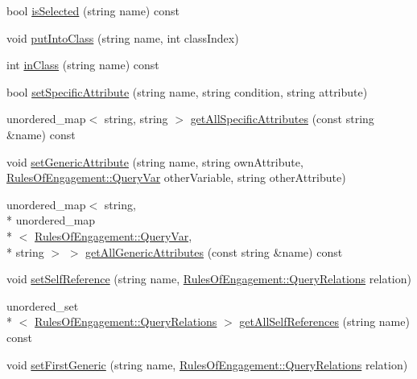 \begin{DoxyCompactItemize}
\item 
bool \hyperlink{class_synonym_table_adeb09b979a0bcd53d00bebf7fd92354f}{is\-Selected} (string name) const 
\item 
void \hyperlink{class_synonym_table_a461d53cb875fda3483d518a0a8a8427a}{put\-Into\-Class} (string name, int class\-Index)
\item 
int \hyperlink{class_synonym_table_a4e52969d9060d59eb5043116a4585557}{in\-Class} (string name) const 
\item 
bool \hyperlink{class_synonym_table_ac0c497004d152f96c11dad973661f0f4}{set\-Specific\-Attribute} (string name, string condition, string attribute)
\item 
unordered\-\_\-map$<$ string, string $>$ \hyperlink{class_synonym_table_aae3ea3b80a7c9d8527299bb709da36e7}{get\-All\-Specific\-Attributes} (const string \&name) const 
\item 
void \hyperlink{class_synonym_table_a85c04b706602d1ee0c3587bd6a81c4a4}{set\-Generic\-Attribute} (string name, string own\-Attribute, \hyperlink{class_rules_of_engagement_a5dd2b28fd0c906d9b08e29e371713ead}{Rules\-Of\-Engagement\-::\-Query\-Var} other\-Variable, string other\-Attribute)
\item 
unordered\-\_\-map$<$ string, \\*
unordered\-\_\-map\\*
$<$ \hyperlink{class_rules_of_engagement_a5dd2b28fd0c906d9b08e29e371713ead}{Rules\-Of\-Engagement\-::\-Query\-Var}, \\*
string $>$ $>$ \hyperlink{class_synonym_table_a24fafd4eef36373854f0552639d1a23a}{get\-All\-Generic\-Attributes} (const string \&name) const 
\item 
void \hyperlink{class_synonym_table_a36b37e92292323e9456687723296a775}{set\-Self\-Reference} (string name, \hyperlink{class_rules_of_engagement_a5e08db2a0638b98dbb06ad923a33d817}{Rules\-Of\-Engagement\-::\-Query\-Relations} relation)
\item 
unordered\-\_\-set\\*
$<$ \hyperlink{class_rules_of_engagement_a5e08db2a0638b98dbb06ad923a33d817}{Rules\-Of\-Engagement\-::\-Query\-Relations} $>$ \hyperlink{class_synonym_table_a575a9b37ab43fbea6db53d042c9e40f1}{get\-All\-Self\-References} (string name) const 
\item 
void \hyperlink{class_synonym_table_aee299da4aef681bd88aef87c3e32d0ae}{set\-First\-Generic} (string name, \hyperlink{class_rules_of_engagement_a5e08db2a0638b98dbb06ad923a33d817}{Rules\-Of\-Engagement\-::\-Query\-Relations} relation)

\end{DoxyCompactItemize}
